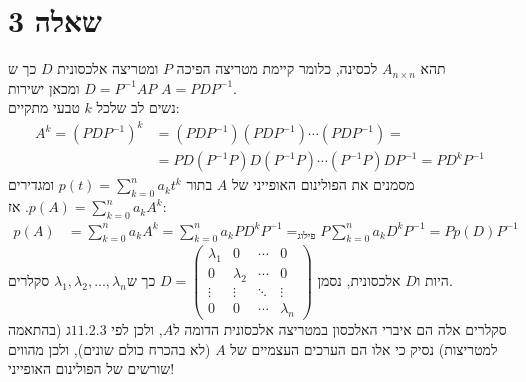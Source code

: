 \documentclass{article}
\DeclareMathOperator*{\equals}{=}
\begin{document}
\section*{שאלה 3}
תהא $A_{n\times n}$ לכסינה, כלומר קיימת מטריצה הפיכה $P$ ומטריצה אלכסונית $D$ כך ש $D=P^{-1}AP$ ומכאן ישירות $A=PDP^{-1}$.\\
נשים לב שלכל $k$ טבעי מתקיים:
\begin{align*}
    A^k=(PDP^{-1})^k & =(PDP^{-1})(PDP^{-1})\cdots(PDP^{-1})=                   \\
                     & =PD(P^{-1}P)D(P^{-1}P)\cdots (P^{-1}P)DP^{-1}=PD^kP^{-1}
\end{align*}
מסמנים את הפולינום האופייני של $A$ בתור $p(t)=\sum_{k=0}^n a_kt^k$ ומגדירים $p(A)=\sum_{k=0}^n a_kA^k$. אז:
\begin{align*}
    p(A) & =
    \sum_{k=0}^n a_k A^k=
    \sum_{k=0}^n a_k PD^kP^{-1}\equals_{\text{פילוג}}
    P \sum_{k=0}^n a_k D^k P^{-1}= Pp(D)P^{-1}
\end{align*}
היות ו$D$ אלכסונית, נסמן $
    D=\begin{pmatrix}
        \lambda_1 & 0         & \cdots & 0         \\
        0         & \lambda_2 & \cdots & 0         \\
        \vdots    & \vdots    & \ddots & \vdots    \\
        0         & 0         & \cdots & \lambda_n
    \end{pmatrix}
$ כך ש$\lambda_1, \lambda_2, ..., \lambda_n$ סקלרים. \\
סקלרים אלה הם איברי האלכסון במטריצה אלכסונית הדומה ל$A$, ולכן לפי $11.2.3$ג (בהתאמה למטריצות) נסיק כי אלו הם הערכים העצמיים של $A$ (לא בהכרח כולם שונים), ולכן מהווים שורשים של הפולינום האופייני!
\end{document}
